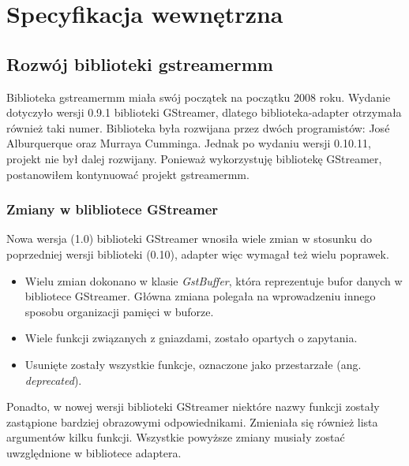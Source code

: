 \documentclass[12pt]{article}
\begin{document}
\section{Specyfikacja wewnętrzna}
\subsection{Rozwój biblioteki gstreamermm}
Biblioteka gstreamermm miała swój początek na początku 2008 roku. Wydanie dotyczyło wersji 0.9.1 biblioteki GStreamer, dlatego biblioteka-adapter otrzymała również taki numer. Biblioteka była rozwijana przez dwóch programistów: José Alburquerque oraz Murraya Cumminga. Jednak po wydaniu wersji 0.10.11, projekt nie był dalej rozwijany. Ponieważ wykorzystuję bibliotekę GStreamer, postanowiłem kontynuować projekt gstreamermm.
\subsubsection{Zmiany w blibliotece GStreamer}
Nowa wersja (1.0) biblioteki GStreamer wnosiła wiele zmian w stosunku do poprzedniej wersji biblioteki (0.10), adapter więc wymagał też wielu poprawek. 
\begin{itemize}
 \setlength{\itemsep}{0em}
  \item Wielu zmian dokonano w klasie \textit{GstBuffer}, która reprezentuje bufor danych w bibliotece GStreamer. Główna zmiana polegała na wprowadzeniu innego sposobu organizacji pamięci w buforze.
  \item Wiele funkcji związanych z gniazdami, zostało opartych o zapytania.
  \item Usunięte zostały wszystkie funkcje, oznaczone jako przestarzałe (ang. \textit{deprecated}).
\end{itemize}
Ponadto, w nowej wersji biblioteki GStreamer niektóre nazwy funkcji zostały zastąpione bardziej obrazowymi odpowiednikami. Zmieniała się również lista argumentów kilku funkcji.
Wszystkie powyższe zmiany musiały zostać uwzględnione w bibliotece adaptera.
\end{document}
